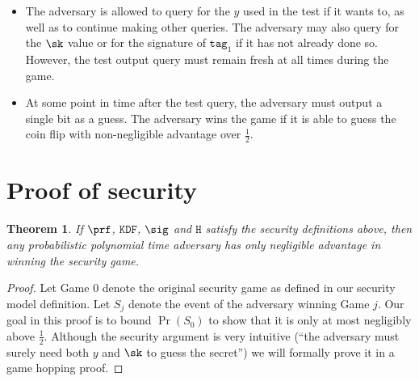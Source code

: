 \documentclass{article}
\newtheorem{theorem}{Theorem}[section]
\begin{document}
{\begin{itemize}
	We also say that an \texttt{output} query is ``non-trivial'' if one of the following conditions is satisfied
	
	\begin{itemize}
		\item this query is of the first type $\texttt{tag}_1, \texttt{tag}_2, y, n$ where query with $\texttt{tag}_1, \texttt{tag}_2, y$ has not been made before. 
		
		\item this query is of the second type $\texttt{tag}_1, \texttt{tag}_2, n$.  
	\end{itemize}
	
	
	At some point in time, the adversary must make a so-called test \texttt{output} query. This is the same as a normal non-trivial \texttt{output} query except the challenger flips an unbiased coin and either responds with the genuine output using the wrapper, or a uniformly randomly chosen string of the same length. 
	
	\item The adversary is allowed to query for the $y$ used in the test if it wants to, as well as to continue making other queries. The adversary may also query for the $\sk$ value or for the signature of $\texttt{tag}_1$ if it has not already done so. However, the test output query must remain fresh at all times during the game.
	
	\item At some point in time after the test query, the adversary must output a single bit as a guess. The adversary wins the game if it is able to guess the coin flip with non-negligible advantage over $\frac{1}{2}$.
\end{itemize}

\section{Proof of security} \label{proof}

\begin{theorem}
If $\prf$, $\texttt{KDF}$, $\sig$ and $\texttt{H}$ satisfy the security definitions above, then any probabilistic polynomial time adversary has only negligible advantage in winning the security game.	
\end{theorem}

\begin{proof}
	Let Game 0 denote the original security game as defined in our security model definition. Let $S_j$ denote the event of the adversary winning Game $j$. Our goal in this proof is to bound $\Pr(S_0)$ to show that it is only at most negligibly above $\frac{1}{2}$. Although the security argument is very intuitive (``the adversary must surely need both $y$ and $\sk$ to guess the secret'') we will formally prove it in a game hopping proof.


\end{proof}}
\end{document}
